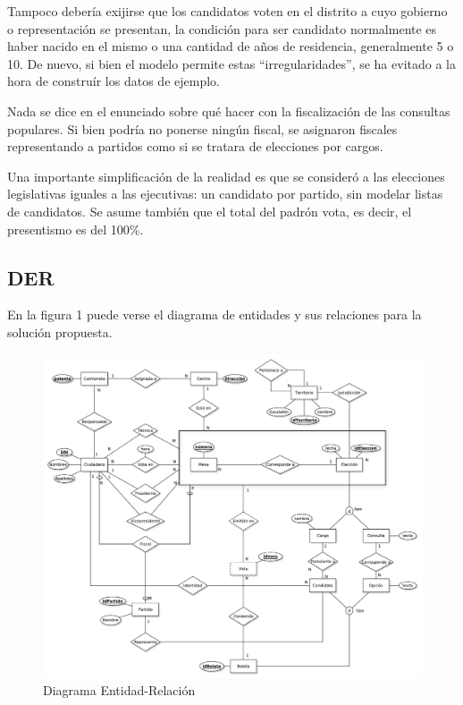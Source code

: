\documentclass{article}
\begin{document}

Tampoco debería exijirse que los candidatos voten en el distrito a cuyo gobierno o representación se
presentan, la condición para ser candidato normalmente es haber nacido en el mismo o una cantidad de
años de residencia, generalmente 5 o 10.  De nuevo, si bien el modelo permite estas
``irregularidades'', se ha evitado a la hora de construír los datos de ejemplo.

Nada se dice en el enunciado sobre qué hacer con la fiscalización de las consultas populares.  Si
bien podría no ponerse ningún fiscal, se asignaron fiscales representando a partidos como si se
tratara de elecciones por cargos.

Una importante simplificación de la realidad es que se consideró a las elecciones legislativas
iguales a las ejecutivas: un candidato por partido, sin modelar listas de candidatos. Se asume
también que el total del padrón vota, es decir, el presentismo es del 100\%.



\subsection{DER}
En la figura 1 puede verse el diagrama de entidades y sus relaciones para la solución propuesta.

\begin{figure}[h!]
	\includegraphics[scale=0.3]{DER}
    \caption{Diagrama Entidad-Relación}
\end{figure}
\end{document}
